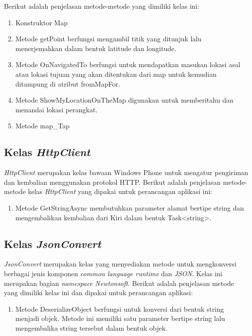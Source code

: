 Berikut adalah penjelasan metode-metode yang dimiliki kelas ini:
\begin{enumerate}
	\item Konstruktor Map
	\item Metode getPoint berfungsi mengambil titik yang ditunjuk lalu menerjemahkan dalam bentuk latitude dan longitude. 
	\item Metode OnNavigatedTo berfungsi untuk mendapatkan masukan lokasi asal atau lokasi tujuan yang akan ditentukan dari map untuk kemudian ditampung di atribut fromMapFor.
	\item Metode ShowMyLocationOnTheMap digunakan untuk memberitahu dan menandai lokasi perangkat.
	\item Metode map\_Tap
\end{enumerate}

\subsection{Kelas \textit{HttpClient}}
\label{lab:Kelas HttpClient}
\hspace{0.5cm} \textit{HttpClient} merupakan kelas bawaan Windows Phone untuk mengatur pengiriman dan kembalian menggunakan protokol HTTP. Berikut adalah penjelasan metode-metode kelas \textit{HttpClient} yang dipakai untuk perancangan aplikasi ini:
\begin{enumerate}
	\item Metode GetStringAsync membutuhkan parameter alamat bertipe string dan mengembalikan kembalian dari Kiri dalam bentuk Task<string>.
\end{enumerate}

\subsection{Kelas \textit{JsonConvert}}
\label{lab:Kelas JsonConvert}
\hspace{0.5cm} \textit{JsonConvert} merupakan kelas yang menyediakan metode untuk mengkonversi berbagai jenis komponen \textit{common language runtime} dan \textit{JSON}. Kelas ini merupakan bagian \textit{namespace Newtonsoft}.  Berikut adalah penjelasan metode yang dimiliki kelas ini dan dipakai untuk perancangan aplikasi:
\begin{enumerate}
	\item Metode DeserializeObject berfungsi untuk konversi dari bentuk string menjadi objek. Metode ini memiliki satu parameter bertipe string lalu mengembalika string tersebut dalam bentuk objek.
\end{enumerate}

